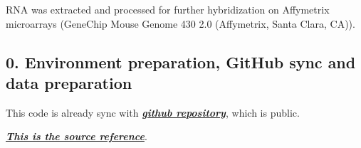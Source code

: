 \documentclass[]{article}
\begin{document}
RNA was extracted and processed for further hybridization on Affymetrix
microarrays (GeneChip Mouse Genome 430 2.0 (Affymetrix, Santa Clara,
CA)).

\subsection{0. Environment preparation, GitHub sync and data
preparation}\label{environment-preparation-github-sync-and-data-preparation}

This code is already sync with
\textbf{\emph{\href{https://github.com/AnadelVal/epigeneticsGSE55304}{github
repository}}}, which is public.

\textbf{\emph{\href{https://www.ncbi.nlm.nih.gov/geo/query/acc.cgi?acc=GSE55304}{This
is the source reference}}}.
\end{document}
